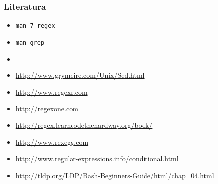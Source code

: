 \documentclass[table,usenames,dvipsnames]{beamer}
\newcommand{\shell}[1]{\texttt{#1}}
\begin{document}
\begin{frame}[t]
\frametitle{Literatura}
\begin{itemize}
	\item[] \shell{man 7 regex}
	\item[] \shell{man grep}
	\item[]
  \item[] \small\url{http://www.grymoire.com/Unix/Sed.html}
  \item[] \small\url{http://www.regexr.com}
  \item[] \small\url{http://regexone.com}
  \item[] \small\url{http://regex.learncodethehardway.org/book/}
  \item[] \small\url{http://www.rexegg.com}
  \item[] \small\url{http://www.regular-expressions.info/conditional.html} 
  \item[] \small\url{http://tldp.org/LDP/Bash-Beginners-Guide/html/chap_04.html}
\end{itemize}
\end{frame}
\end{document}
